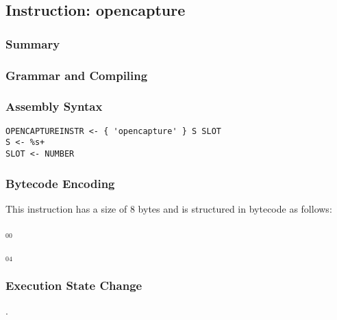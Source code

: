 \subsection{Instruction: opencapture}

\subsubsection{Summary}


\subsubsection{Grammar and Compiling}


\subsubsection{Assembly Syntax}

\begin{myquote}
\begin{verbatim}
OPENCAPTUREINSTR <- { 'opencapture' } S SLOT
S <- %s+
SLOT <- NUMBER
\end{verbatim}
\end{myquote}

\subsubsection{Bytecode Encoding}

This instruction has a size of 8 bytes and is structured in bytecode as follows:

$_{00}$\ 



$_{04}$\ 


\subsubsection{Execution State Change}

.


